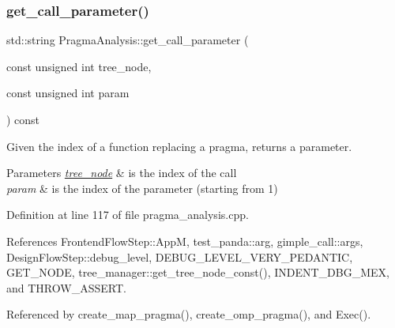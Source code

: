 \subsubsection{\texorpdfstring{get\+\_\+call\+\_\+parameter()}{get\_call\_parameter()}}
{\footnotesize\ttfamily std\+::string Pragma\+Analysis\+::get\+\_\+call\+\_\+parameter (\begin{DoxyParamCaption}\item[{const unsigned int}]{tree\+\_\+node,  }\item[{const unsigned int}]{param }\end{DoxyParamCaption}) const\hspace{0.3cm}{\ttfamily [private]}}



Given the index of a function replacing a pragma, returns a parameter. 


\begin{DoxyParams}{Parameters}
{\em \hyperlink{classtree__node}{tree\+\_\+node}} & is the index of the call \\
\hline
{\em param} & is the index of the parameter (starting from 1) \\
\hline
\end{DoxyParams}


Definition at line 117 of file pragma\+\_\+analysis.\+cpp.



References Frontend\+Flow\+Step\+::\+AppM, test\+\_\+panda\+::arg, gimple\+\_\+call\+::args, Design\+Flow\+Step\+::debug\+\_\+level, D\+E\+B\+U\+G\+\_\+\+L\+E\+V\+E\+L\+\_\+\+V\+E\+R\+Y\+\_\+\+P\+E\+D\+A\+N\+T\+IC, G\+E\+T\+\_\+\+N\+O\+DE, tree\+\_\+manager\+::get\+\_\+tree\+\_\+node\+\_\+const(), I\+N\+D\+E\+N\+T\+\_\+\+D\+B\+G\+\_\+\+M\+EX, and T\+H\+R\+O\+W\+\_\+\+A\+S\+S\+E\+RT.



Referenced by create\+\_\+map\+\_\+pragma(), create\+\_\+omp\+\_\+pragma(), and Exec().

